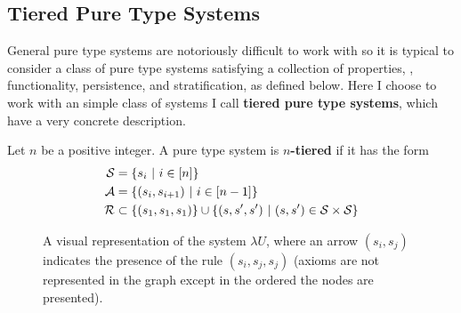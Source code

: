 \documentclass{article}
\begin{document}
\subsection{Tiered Pure Type Systems}

General pure type systems are notoriously difficult to work with so it is typical to consider a class of pure type systems satisfying a collection of properties, \eg, functionality, persistence, and stratification, as defined below.
Here I choose to work with an simple class of systems I call \textbf{tiered pure type systems}, which have a very concrete description.

\begin{definition}
Let $n$ be a positive integer.
A pure type system is \textbf{$n$-tiered} if it has the form
\begin{align*}
    \mathcal S &= \{s_i \ | \ i \in [n]\} \\
    \mathcal A &= \{(s_i, s_{i + 1}) \ | \ i \in [n - 1]\} \\
    \mathcal R &\subset \{(s_1, s_1, s_1)\} \cup \{(s, s', s') \ | \ (s, s') \in \mathcal S \times \mathcal S\}
\end{align*}
\end{definition}

\begin{figure}
\centering
\caption{A visual representation of the system $\lambda U$, where an arrow $(s_i, s_j)$ indicates the presence of the rule $(s_i, s_j, s_j)$ (axioms are not represented in the graph except in the ordered the nodes are presented).}
\label{fig:tiered}
\end{figure}
\end{document}
